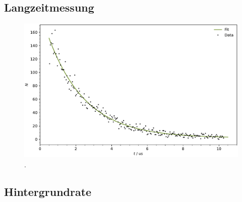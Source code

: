 \subsection{Langzeitmessung}

\begin{figure}[H]
	\centering
	\includegraphics[width=\textwidth]{build/lifetime.pdf}
	\caption{.}
	\label{fig:lifetime}
\end{figure}



\subsection{Hintergrundrate}
